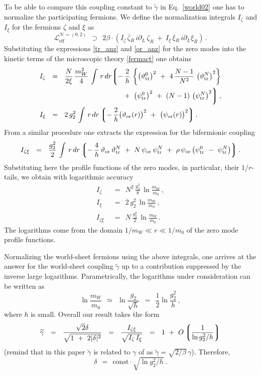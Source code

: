 \documentclass[12pt]{article}
\def\beq{\begin{equation}}
\def\eeq{\end{equation}}
\newcommand{\p}{\partial}
\newcommand{\wt}{\widetilde}
\newcommand{\ov}{\overline}
\newcommand{\mc}[1]{\mathcal{#1}}
\newcommand{\lgr}{\left\lgroup}
\newcommand{\rgr}{\right\rgroup}
\newcommand{\bxir}{\ov{\xi}{}_R}
\newcommand{\xir}{\xi_R}
\newcommand{\bzr}{\ov{\zeta}{}_R}
\newcommand{\zr}{\zeta_R}
\newcommand{\pts}{\psi_{\rm tr}^0}
\newcommand{\ptN}{\psi_{\rm tr}^N}
\newcommand{\tts}{\vartheta_{\rm tr}^0}
\newcommand{\ttN}{\vartheta_{\rm tr}^N}
\newcommand{\tor}{\vartheta_{\rm or}}
\newcommand{\por}{\psi_{\rm or}}
\newcommand{\tgamma}{\wt{\gamma}}
\begin{document}
To be able to compare this coupling constant to $ \tgamma $ in Eq.~\eqref{world02} one has to normalize 
the participating fermions.
We define the normalization integrals $ I_\zeta $ and $ I_\xi $ for the fermions $ \zeta $ and $ \xi $ as
\beq
\label{kin_norm}
	\mc{L}_\text{eff}^{\mc{N}=(0,2)} ~~\supset~~
	2\beta \cdot ( I_\zeta\, \bzr\, i\p_L\,\zr  ~+~ I_\xi\, \bxir\, i\p_L \xir ) \,.
\eeq
Substituting the expressions \eqref{tr_anz} and \eqref{or_anz} for the zero modes into the kinetic terms
of the microscopic theory \eqref{fermact} one obtains
\begin{align*}
%
	I_\zeta & ~~=~~ \frac{N}{2\xi}\, \frac{m_W^2}{4}\, \int\, r\,dr 
		\biggl\lgroup -\, \frac{2}{h}\, 
			  \left\{ \left( \tts \right)^2 
				~+~ 4\,\frac{N-1}{N^2}\, \left( \ttN \right)^2 \right\} \\
		& \qquad\qquad\qquad\qquad\qquad~~
			~+~ \left( \pts \right)^2 ~+~ (N-1)\,\left( \ptN \right)^2  \biggr\rgroup\,, \\
%
	I_\xi & ~~=~~ 2\,g_2^2\, \int\, r\,dr 
		\lgr -\,\frac{2}{h}\bigl( \tor(r) \bigr)^2 ~+~ \bigl( \por(r) \bigr)^2 \rgr.
\end{align*}
From a similar procedure one extracts the expression for the bifermionic coupling
\[
	I_{\zeta\xi} ~~=~~ \frac{g_2^2}{2}\, \int\, r\,dr
		\lgr -\,\frac{4}{h}\,\tor\,\ttN  ~+~ N\, \por\,\ptN  
			~+~ \rho\, \por \left( \pts ~-~ \ptN \right) \rgr.
\]
Substituting here the profile functions of the zero modes, in particular, their $ 1/r $-tails,
we obtain with logarithmic accuracy
\begin{align*}
%
	I_\zeta & ~~=~~ N^2\,\frac{g_2^2}{8}\, \ln \frac{m_W}{m_0}\,, \\
%
	I_\xi   & ~~=~~ 2\,g_2^2\, \ln \frac{m_W}{m_0}\,, \\
%
	I_{\zeta\xi} & ~~=~~ N\, \frac{g_2^2}{2}\,  \ln \frac{m_W}{m_0}\,.
\end{align*}
The logarithms come from the domain $ 1/m_W \ll r \ll 1/m_0 $  of the zero mode profile
functions.

Normalizing the world-sheet fermions using the above integrals, one arrives at the answer
for the world-sheet coupling $ \tgamma $ up to a contribution suppressed by the inverse large logarithms.
Parametrically, the logarithms under consideration can be written as 
\[
	\ln \frac{m_W}{m_0}  ~~\simeq~~ 
			\ln \frac{g_2}{\sqrt{h}} ~~=~~ \frac12 \ln \frac{g_2^2}{h}\,,
\]
where $ h $ is small.
Overall our result takes the form
\[
	\tgamma ~~=~~ \frac{\sqrt{2}\delta}{\sqrt{1 ~+~ 2|\delta|^2}} ~~=~~ 
		\frac{I_{\zeta\xi}}{\sqrt{I_\zeta\, I_\xi}}  ~~=~~
			1 ~+~ O\lgr \frac{1}{\ln g_2^2/h } \rgr
\]
	(remind that in this paper $ \tgamma $ is related to $ \gamma $ of \cite{SYhet} as
	$ \tgamma = \sqrt{2/\beta}\, \gamma $).
Therefore, 
\beq
\label{deltaresult}
	\delta ~~=~~ \text{const}\cdot \sqrt{\ln g_2^2/h}\,.
\eeq
\end{document}

